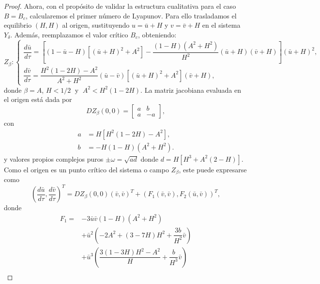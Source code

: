 \documentclass[]{article}
\theoremstyle{remark}
\begin{document}
\begin{proof}
		Ahora, con el propósito de validar la estructura cualitativa para el caso $B = B_c$, calcularemos el primer número de Lyapunov. Para ello trasladamos el equilibrio $(H,H)$ al origen, sustituyendo $u = \bar{u} + H$ y $v = \bar{v} + H$ en el sistema $Y_\delta$. Además, reemplazamos el valor crítico $B_c$, obteniendo:
		\begin{equation*}
			Z_{\beta}:
			\begin{cases}
				\dfrac{d\bar{u}}{d \tau} = [(1 - \bar{u} - H)[(\bar{u} + H)^{2} + A^{2}] - \dfrac{(1-H)(A^2+H^{2})}{H^{2}} (\bar{u} + H) (\bar{v} + H)](\bar{u} + H)^{2}, \\[5pt]
				\dfrac{d\bar{v}}{d \tau} = \dfrac{H^2(1-2H) - A^2}{A^2 + H^2}(\bar{u} - \bar{v})[(\bar{u} + H)^{2} + A^{2}](\bar{v} + H),
			\end{cases}
		\end{equation*}
		donde $\beta = A$, $H<1/2 \; \text{ y } \; A^2 < H^2(1-2H).$ La matriz jacobiana evaluada en el origen está dada por
		\begin{equation*}
			DZ_{\beta}(0,0) =
			\begin{bmatrix}
				a & b \\
				a & - a
			\end{bmatrix},
		\end{equation*}
		con
		\begin{equation*}
			\begin{aligned}
				a &= H[H^{2}(1-2H)-A^2], \\
				b &= -H(1-H)(A^2+H^2).
			\end{aligned}
		\end{equation*}
		y valores propios complejos puros $\pm \omega = \sqrt{ad}$ donde $d = H[H^3+A^2(2-H)]$. Como el origen es un punto crítico del sistema o campo $Z_{\beta}$, este puede expresarse como
		\begin{equation}
			\left(\dfrac{d\bar{u}}{d \tau}, \dfrac{d\bar{v}}{d \tau}\right)^T=DZ_{\beta}(0,0)(\bar{v},\bar{v})^T+(F_1(\bar{v},\bar{v}), F_2(\bar{u},\bar{v}))^T,
			\label{eq: sistemal1}
		\end{equation}
		donde
		\begin{equation}
			\begin{aligned}
				F_1 = & -3\bar{u}\bar{v}(1 - H)(A^2 + H^2) \\
				& + \bar{u}^2\left(-2A^2 + (3 - 7H)H^2 + \dfrac{3b}{H^2} \bar{v} \right) \\ 
				& + \bar{u}^3\left(\dfrac{3(1 - 3H)H^2 - A^2}{H} + \dfrac{b}{H^3} \bar{v} \right) \\ 

\end{aligned}
\end{equation}
\end{proof}
\end{document}
